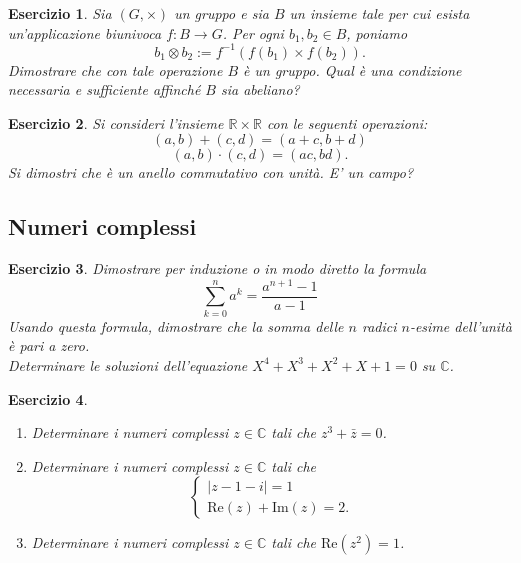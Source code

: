 \documentclass{article}
\newtheorem{es}{Esercizio}
\begin{document}
{\begin{es}
    Sia $(G,\times)$ un gruppo e sia $B$ un insieme tale per cui esista un'applicazione biunivoca $f:B\rightarrow G$. Per ogni $b_1,b_2\in B$, poniamo 
$$b_1\otimes b_2:=f^{-1}(f(b_1)\times f(b_2)).$$
Dimostrare che con tale operazione $B$ è un gruppo. Qual è una condizione necessaria e sufficiente affinch\'e $B$ sia abeliano?
\end{es}
\begin{es}
    Si consideri l'insieme $\mathbb{R}\times \mathbb{R}$ con le seguenti operazioni:
    $$ (a,b)+(c,d)=(a+c,b+d)$$
    $$(a,b)\cdot(c,d)=(ac,bd).
    $$
    Si dimostri che è un anello commutativo con unità. E' un campo?
\end{es}













\subsection{Numeri complessi}


\begin{es}
    Dimostrare per induzione o in modo diretto la formula
    $$\sum_{k=0}^n a^k=\frac{a^{n+1}-1}{a-1}$$
    Usando questa formula, dimostrare che la somma delle $n$ radici $n$-esime dell'unità è pari a zero.\\
    Determinare le soluzioni dell'equazione $X^4 + X^3 + X^2 + X + 1=0$ su $\mathbb{C}$.
\end{es}



\begin{es}
\begin{enumerate}
    \item Determinare i numeri complessi $z\in\mathbb{C}$ tali che $z^3+\bar{z}=0$.
    \item Determinare i numeri complessi $z\in\mathbb{C}$ tali che 
    $$\begin{cases}|z-1-i|=1\\\mathrm{Re}(z)+\mathrm{Im}(z)=2. \end{cases}$$
    \item Determinare i numeri complessi $z\in \mathbb{C}$ tali che
    $\mathrm{Re}(z^2)=1$.
\end{enumerate}
\end{es}





}
\end{document}
